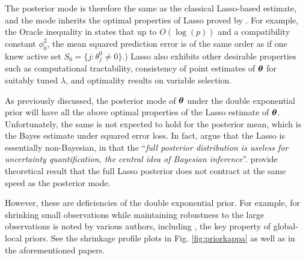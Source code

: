 \documentclass[11pt]{article}
\begin{document}
The posterior mode is therefore	the	 same as the classical Lasso-based estimate, and the mode inherits the optimal properties of Lasso proved by \cite{buhlmann2011statistics}. For example, the Oracle inequality in \citet[Eq. (2.8), Th. (6.1)]{buhlmann2011statistics} states that up to $O(\log(p))$ and a compatibility constant $\phi_0^2$, the mean squared prediction error is of the same order as if one knew active set $S_0 = \{j : \theta_j^0 \neq 0 \}$.)  Lasso also exhibits other desirable properties such as computational tractability, consistency of point estimates of $\boldsymbol{\theta}$ for suitably tuned $\lambda$, and optimality results on variable selection. 

As previously discussed, the posterior mode of $\boldsymbol{\theta}$ under the double exponential prior will have all the above optimal properties of the Lasso estimate of $\boldsymbol{\theta}$. Unfortunately, the same is not expected to hold for the posterior mean, which is the Bayes estimate under squared error loss. In fact, \citet{castillo2015bayesian} argue that the Lasso is essentially non-Bayesian, in that the ``\textsl{full posterior distribution is useless for uncertainty quantification, the central idea of Bayesian inference}''. \citet{castillo2015bayesian} provide theoretical result that the full Lasso posterior does not contract at the same speed as the posterior mode. 

However, these are deficiencies of the double exponential prior. For example, for shrinking small observations while maintaining robustness to the large observations is noted by various authors, including \cite{polson2010shrink,datta2013asymptotic}, the key property of global-local priors. See the shrinkage profile plots in Fig. \ref{fig:priorkappa} as well as in the aforementioned papers.

\end{document}

